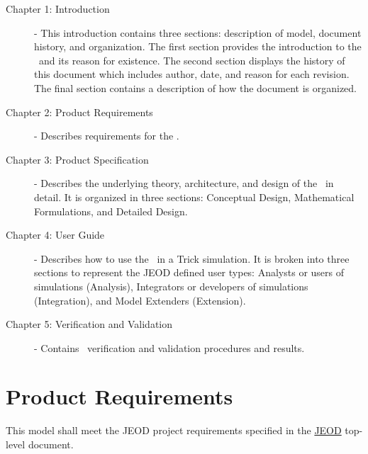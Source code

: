 \begin{description}

\item[Chapter 1: Introduction] - 
This introduction contains three sections: description of model, document history, and organization.  
The first section provides the introduction to the \NamedItemDesc\ and its reason 
for existence. 
The second section displays the history of this document which includes
author, date, and reason for each revision.
The final
section contains a description of how the document is organized.

\item[Chapter 2: Product Requirements] - 
Describes requirements for the \NamedItemDesc.

\item[Chapter 3: Product Specification] - 
Describes the underlying theory, architecture, and design of the \NamedItemDesc\ in detail.  It is organized in 
three sections: Conceptual Design, Mathematical Formulations, and Detailed Design.

\item[Chapter 4: User Guide] - 
Describes how to use the \NamedItemDesc\ in a Trick simulation.  It is broken into three sections to represent the JEOD 
defined user types: Analysts or users of simulations (Analysis), Integrators or developers of simulations (Integration),
and Model Extenders (Extension).

\item[Chapter 5: Verification and Validation] -  
Contains \NamedItemDesc\ verification and validation procedures and results.

\end{description}

\chapter{Product Requirements}\label{ch:reqt}
This model shall meet the JEOD project requirements specified in the 
\hyperref{file:\JEODHOME/docs/JEOD.pdf}{part1}{reqt}{JEOD} top-level document.

%
%      
%   
%
%

